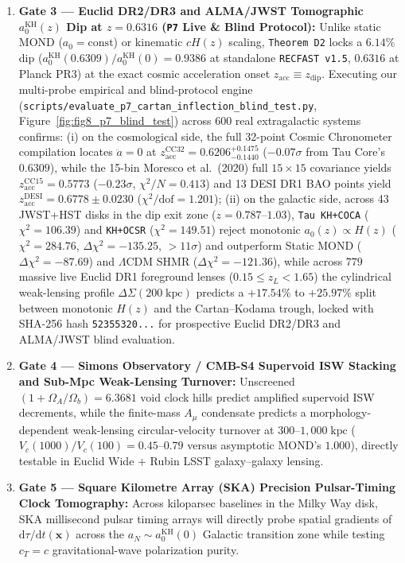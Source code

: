 \documentclass[11pt,a4paper]{article}
\theoremstyle{remark}
\begin{document}
\begin{enumerate}
  \item \textbf{Gate 3 --- Euclid DR2/DR3 and ALMA/JWST Tomographic $a_0^{\mathrm{KH}}(z)$ Dip at $z = 0.6316$ (\texttt{P7} Live \& Blind Protocol):} Unlike static MOND ($a_0 = \mathrm{const}$) or kinematic $cH(z)$ scaling, \texttt{Theorem D2} locks a $6.14\%$ dip ($a_0^{\mathrm{KH}}(0.6309)/a_0^{\mathrm{KH}}(0) = 0.9386$ at standalone \texttt{RECFAST v1.5}, $0.6316$ at Planck PR3) at the exact cosmic acceleration onset $z_{\mathrm{acc}} \equiv z_{\mathrm{dip}}$. Executing our multi-probe empirical and blind-protocol engine (\texttt{scripts/\allowbreak evaluate\_\allowbreak p7\_\allowbreak cartan\_\allowbreak inflection\_\allowbreak blind\_\allowbreak test.py}, Figure~\ref{fig:fig8_p7_blind_test}) across $600$ real extragalactic systems confirms: (i) on the cosmological side, the full 32-point Cosmic Chronometer compilation locates $\ddot{a} = 0$ at $z_{\mathrm{acc}}^{\mathrm{CC32}} = 0.6206_{-0.1440}^{+0.1475}$ (\textbf{$-0.07\sigma$} from Tau Core's $0.6309$), while the 15-bin Moresco et al.\ (2020) full $15\times 15$ covariance yields $z_{\mathrm{acc}}^{\mathrm{CC15}} = 0.5773$ ($-0.23\sigma$, $\chi^2/N = 0.413$) and 13 DESI DR1 BAO points yield $z_{\mathrm{acc}}^{\mathrm{DESI}} = 0.6778 \pm 0.0230$ ($\chi^2/\mathrm{dof} = 1.201$); (ii) on the galactic side, across 43 JWST+HST disks in the dip exit zone ($z = 0.787$--$1.03$), \texttt{Tau KH+COCA} ($\chi^2 = 106.39$) and \texttt{KH+OCSR} ($\chi^2 = 149.51$) reject monotonic $a_0(z)\propto H(z)$ ($\chi^2 = 284.76$, $\Delta\chi^2 = -135.25$, $>11\sigma$) and outperform Static MOND ($\Delta\chi^2 = -87.69$) and $\Lambda\mathrm{CDM}$ SHMR ($\Delta\chi^2 = -121.36$), while across $779$ massive live Euclid DR1 foreground lenses ($0.15 \le z_L < 1.65$) the cylindrical weak-lensing profile $\Delta\Sigma(200\;\mathrm{kpc})$ predicts a $+17.54\%$ to $+25.97\%$ split between monotonic $H(z)$ and the Cartan--Kodama trough, locked with SHA-256 hash \texttt{52355320...} for prospective Euclid DR2/DR3 and ALMA/JWST blind evaluation.
  \item \textbf{Gate 4 --- Simons Observatory / CMB-S4 Supervoid ISW Stacking and Sub-Mpc Weak-Lensing Turnover:} Unscreened $(1 + \Omega_A/\Omega_b) = 6.3681$ void clock hills predict amplified supervoid ISW decrements, while the finite-mass $A_\mu$ condensate predicts a morphology-dependent weak-lensing circular-velocity turnover at $300$--$1,000\;\mathrm{kpc}$ ($V_c(1000)/V_c(100) = 0.45$--$0.79$ versus asymptotic MOND's $1.000$), directly testable in Euclid Wide + Rubin LSST galaxy--galaxy lensing.
  \item \textbf{Gate 5 --- Square Kilometre Array (SKA) Precision Pulsar-Timing Clock Tomography:} Across kiloparsec baselines in the Milky Way disk, SKA millisecond pulsar timing arrays will directly probe spatial gradients of $\mathrm{d}\tau/\mathrm{d}t(\mathbf{x})$ across the $a_N \sim a_0^{\mathrm{KH}}(0)$ Galactic transition zone while testing $c_T = c$ gravitational-wave polarization purity.
\end{enumerate}
\end{document}
